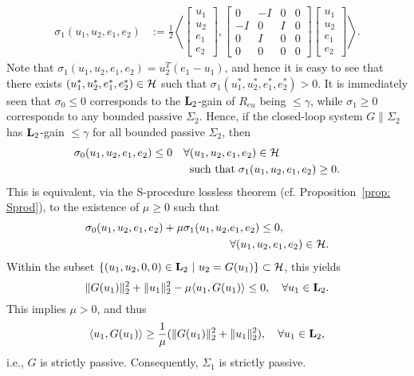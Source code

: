 \documentclass[11pt]{article}
\newcommand{\Ltwo}{\boldsymbol{\rm L}_{2}}
\begin{document}
\begin{align*}
 \sigma_1(u_1, u_2, e_1, e_2) & := \frac{1}{2} \left\langle 
\begin{bmatrix} 
 u_1 \\
 u_2 \\
 e_1 \\
 e_2
\end{bmatrix}, 
\begin{bmatrix}
0 & -I & 0 & 0 \\
-I & 0 & I & 0 \\
0 & I &0 & 0 \\
0 & 0 & 0 & 0
\end{bmatrix}
\begin{bmatrix} 
 u_1 \\
 u_2 \\
 e_1 \\
 e_2
\end{bmatrix}
\right\rangle.
\end{align*}
Note that $\sigma_1(u_1, u_2, e_1, e_2) = u_2^T(e_1 - u_1)$, and hence it is easy to see that there exists $(u_1^*, u_2^*, e_1^*, e_2^*) \in \mathcal{H}$ such
that $\sigma_1(u_1^*, u_2^*, e_1^*, e_2^*) > 0$.
It is immediately seen that $\sigma_0 \leq 0$ corresponds to the $\Ltwo$-gain of $R_{eu}$ being $ \leq \gamma $, while $\sigma_1 \geq 0$ corresponds
to any bounded  passive $\Sigma_2$. Hence, if the closed-loop system $G \| \Sigma_2$ has $\Ltwo$-gain $\leq \gamma$ for all
bounded  passive $\Sigma_2$, then
\begin{align*}
 \sigma_0(u_1, u_2, e_1, e_2) \leq 0 \quad \forall & (u_1, u_2, e_1, e_2) \in \mathcal{H} \\
 & \text{such that} \; \sigma_1(u_1, u_2, e_1, e_2) \geq 0.
\end{align*}
This is equivalent, via the S-procedure lossless theorem (cf. Proposition~\ref{prop: Sprod}), to the existence of $\mu \geq 0$
such that
\begin{align*}
 \sigma_0(u_1, u_2, e_1, e_2) + \mu \sigma_1(u_1, u_2, & e_1, e_2) \leq 0, \\
 & \forall (u_1, u_2, e_1, e_2) \in \mathcal{H}.
\end{align*}
Within the subset $\{(u_1, u_2, 0, 0) \in \Ltwo\ |\ u_2 = G (u_1)\} \subset \HH$, this yields
\[
\|G (u_1)\|_2^2 + \|u_1\|_2^2 - \mu \langle u_1, G (u_1) \rangle \leq 0, \quad \forall u_1 \in \Ltwo.
\]
This implies $\mu>0$, and thus
\[
\langle u_1, G (u_1) \rangle \geq \frac{1}{\mu} (\|G (u_1)\|_2^2 + \|u_1\|_2^2), \quad \forall u_1 \in \Ltwo,
\]
i.e., $G$ is strictly passive. Consequently, $\Sigma_1$ is strictly passive.
\end{document}
